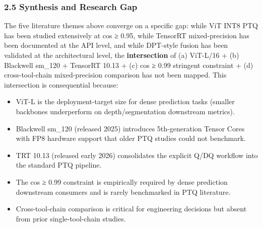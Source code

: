 \documentclass[
]{article}
\providecommand{\tightlist}{%
  \setlength{\itemsep}{0pt}\setlength{\parskip}{0pt}}
\begin{document}
\subsubsection{2.5 Synthesis and Research
Gap}\label{synthesis-and-research-gap}

The five literature themes above converge on a specific gap: while ViT
INT8 PTQ has been studied extensively at cos ≥ 0.95, while TensorRT
mixed-precision has been documented at the API level, and while
DPT-style fusion has been validated at the architectural level, the
\textbf{intersection} of (a) ViT-L/16 + (b) Blackwell sm\_120 + TensorRT
10.13 + (c) cos ≥ 0.99 stringent constraint + (d) cross-tool-chain
mixed-precision comparison has not been mapped. This intersection is
consequential because:

\begin{itemize}
\tightlist
\item
  ViT-L is the deployment-target size for dense prediction tasks
  (smaller backbones underperform on depth/segmentation downstream
  metrics).
\item
  Blackwell sm\_120 (released 2025) introduces 5th-generation Tensor
  Cores with FP8 hardware support that older PTQ studies could not
  benchmark.
\item
  TRT 10.13 (released early 2026) consolidates the explicit Q/DQ
  workflow into the standard PTQ pipeline.
\item
  The cos ≥ 0.99 constraint is empirically required by dense prediction
  downstream consumers and is rarely benchmarked in PTQ literature.
\item
  Cross-tool-chain comparison is critical for engineering decisions but
  absent from prior single-tool-chain studies.
\end{itemize}
\end{document}
